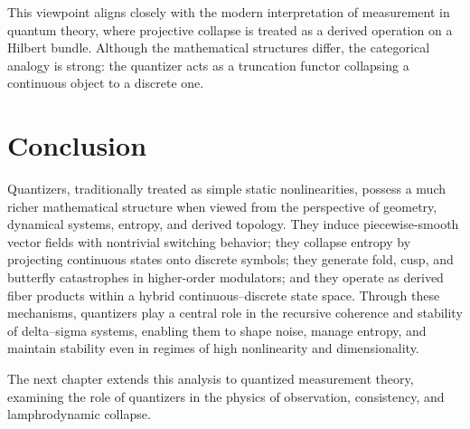 This viewpoint aligns closely with the modern interpretation of measurement in quantum theory, where projective collapse is treated as a derived operation on a Hilbert bundle. Although the mathematical structures differ, the categorical analogy is strong: the quantizer acts as a truncation functor collapsing a continuous object to a discrete one.

\section{Conclusion}

Quantizers, traditionally treated as simple static nonlinearities, possess a much richer mathematical structure when viewed from the perspective of geometry, dynamical systems, entropy, and derived topology. They induce piecewise-smooth vector fields with nontrivial switching behavior; they collapse entropy by projecting continuous states onto discrete symbols; they generate fold, cusp, and butterfly catastrophes in higher-order modulators; and they operate as derived fiber products within a hybrid continuous--discrete state space. Through these mechanisms, quantizers play a central role in the recursive coherence and stability of delta--sigma systems, enabling them to shape noise, manage entropy, and maintain stability even in regimes of high nonlinearity and dimensionality.

The next chapter extends this analysis to quantized measurement theory, examining the role of quantizers in the physics of observation, consistency, and lamphrodynamic collapse.

